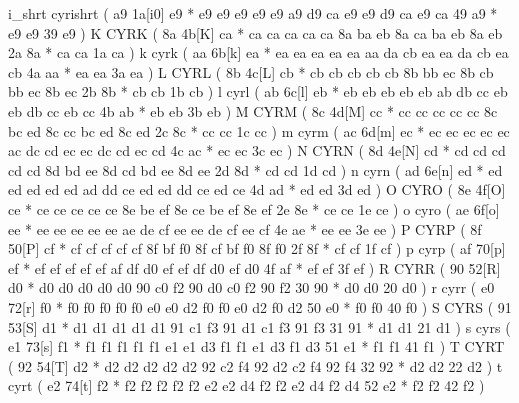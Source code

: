 \makecod i_shrt       cyrishrt          ( a9 1a[i0]  e9 *   e9 e9 e9 e9    e9 a9 d9 ca e9    e9 d9 ca e9    ca 49 a9    *   e9 e9   39 e9  )
\makeCOD K            CYRK              ( 8a 4b[K]   ca *   ca ca ca ca    ca 8a ba eb 8a    ca ba eb 8a    eb 2a 8a    *   ca ca   1a ca  )
\makecod k            cyrk              ( aa 6b[k]   ea *   ea ea ea ea    ea aa da cb ea    ea da cb ea    cb 4a aa    *   ea ea   3a ea  )
\makeCOD L            CYRL              ( 8b 4c[L]   cb *   cb cb cb cb    cb 8b bb ec 8b    cb bb ec 8b    ec 2b 8b    *   cb cb   1b cb  )
\makecod l            cyrl              ( ab 6c[l]   eb *   eb eb eb eb    eb ab db cc eb    eb db cc eb    cc 4b ab    *   eb eb   3b eb  )
\makeCOD M            CYRM              ( 8c 4d[M]   cc *   cc cc cc cc    cc 8c bc ed 8c    cc bc ed 8c    ed 2c 8c    *   cc cc   1c cc  )
\makecod m            cyrm              ( ac 6d[m]   ec *   ec ec ec ec    ec ac dc cd ec    ec dc cd ec    cd 4c ac    *   ec ec   3c ec  )
\makeCOD N            CYRN              ( 8d 4e[N]   cd *   cd cd cd cd    cd 8d bd ee 8d    cd bd ee 8d    ee 2d 8d    *   cd cd   1d cd  )
\makecod n            cyrn              ( ad 6e[n]   ed *   ed ed ed ed    ed ad dd ce ed    ed dd ce ed    ce 4d ad    *   ed ed   3d ed  )
\makeCOD O            CYRO              ( 8e 4f[O]   ce *   ce ce ce ce    ce 8e be ef 8e    ce be ef 8e    ef 2e 8e    *   ce ce   1e ce  )
\makecod o            cyro              ( ae 6f[o]   ee *   ee ee ee ee    ee ae de cf ee    ee de cf ee    cf 4e ae    *   ee ee   3e ee  )
\makeCOD P            CYRP              ( 8f 50[P]   cf *   cf cf cf cf    cf 8f bf f0 8f    cf bf f0 8f    f0 2f 8f    *   cf cf   1f cf  )
\makecod p            cyrp              ( af 70[p]   ef *   ef ef ef ef    ef af df d0 ef    ef df d0 ef    d0 4f af    *   ef ef   3f ef  )
\makeCOD R            CYRR              ( 90 52[R]   d0 *   d0 d0 d0 d0    d0 90 c0 f2 90    d0 c0 f2 90    f2 30 90    *   d0 d0   20 d0  )
\makecod r            cyrr              ( e0 72[r]   f0 *   f0 f0 f0 f0    f0 e0 e0 d2 f0    f0 e0 d2 f0    d2 50 e0    *   f0 f0   40 f0  )
\makeCOD S            CYRS              ( 91 53[S]   d1 *   d1 d1 d1 d1    d1 91 c1 f3 91    d1 c1 f3 91    f3 31 91    *   d1 d1   21 d1  )
\makecod s            cyrs              ( e1 73[s]   f1 *   f1 f1 f1 f1    f1 e1 e1 d3 f1    f1 e1 d3 f1    d3 51 e1    *   f1 f1   41 f1  )
\makeCOD T            CYRT              ( 92 54[T]   d2 *   d2 d2 d2 d2    d2 92 c2 f4 92    d2 c2 f4 92    f4 32 92    *   d2 d2   22 d2  )
\makecod t            cyrt              ( e2 74[t]   f2 *   f2 f2 f2 f2    f2 e2 e2 d4 f2    f2 e2 d4 f2    d4 52 e2    *   f2 f2   42 f2  )
